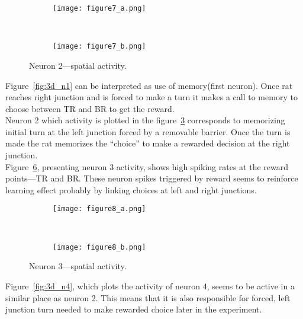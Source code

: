 \documentclass[12pt,a4paper,twocolumn]{article}
\begin{document}
\begin{figure}[htbp]
  \begin{subfigure}{.99\linewidth}\centering
    \texttt{[image: figure7\_a.png]}
    \caption{\label{fig:3d_n2_a}}
  \end{subfigure}\\[1ex]
  \begin{subfigure}{.99\linewidth}\centering
    \texttt{[image: figure7\_b.png]}
    \caption{\label{fig:3d_n2_b}}
  \end{subfigure}

  \caption{Neuron 2---spatial activity.\label{fig:3d_n2}}
\end{figure}

Figure~\ref{fig:3d_n1} can be interpreted as use of memory(first neuron). Once rat reaches right junction and is forced to make a turn it makes a call to memory to choose between TR and BR to get the reward.\\

Neuron 2 which activity is plotted in the figure~\ref{fig:3d_n2} corresponds to memorizing initial turn at the left junction forced by a removable barrier. Once the turn is made the rat memorizes the ``choice'' to make a rewarded decision at the right junction.\\

Figure~\ref{fig:3d_n3}, presenting neuron 3 activity, shows high spiking rates at the reward points---TR and BR. These neuron spikes triggered by reward seems to reinforce learning effect probably by linking choices at left and right junctions.\\

\begin{figure}[htbp]
  \begin{subfigure}{.99\linewidth}\centering
    \texttt{[image: figure8\_a.png]}
    \caption{\label{fig:3d_n3_a}}
  \end{subfigure}\\[1ex]
  \begin{subfigure}{.99\linewidth}\centering
    \texttt{[image: figure8\_b.png]}
    \caption{\label{fig:3d_n3_b}}
  \end{subfigure}

  \caption{Neuron 3---spatial activity.\label{fig:3d_n3}}
\end{figure}

Figure~\ref{fig:3d_n4}, which plots the activity of neuron 4, seems to be active in a similar place as neuron 2. This means that it is also responsible for forced, left junction turn needed to make rewarded choice later in the experiment.\\
\end{document}
